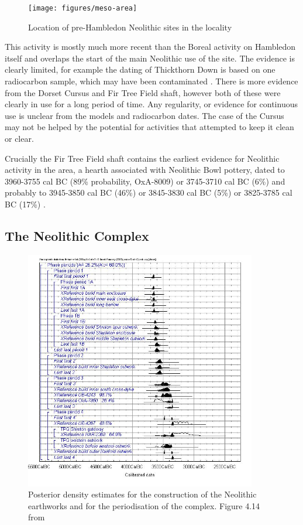 \begin{figure}
\centering
	\texttt{[image: figures/meso-area]}
  \caption{Location of pre-Hambledon Neolithic sites in the locality}
  \label{fig:meso2}
\end{figure}

This activity is mostly much more recent than the Boreal activity on Hambledon itself and overlaps the start of the main Neolithic use of the site. The evidence is clearly limited, for example the dating of Thickthorn Down is based on one radiocarbon sample, which may have been contaminated \citep[155]{Whittle:2011kl}. There is more evidence from the Dorset Cursus and Fir Tree Field shaft, however both of these were clearly in use for a long period of time. Any regularity, or evidence for continuous use is unclear from the models and radiocarbon dates. The case of the Cursus may not be helped by the potential for activities that attempted to keep it clean or clear. 

Crucially the Fir Tree Field shaft contains the earliest evidence for Neolithic activity in the area, a hearth associated with Neolithic Bowl pottery, dated to 3960-3755 cal BC (89\% probability, OxA-8009) or 3745-3710 cal BC (6\%) and probably to 3945-3850 cal BC (46\%) or 3845-3830 cal BC (5\%) or 3825-3785 cal BC (17\%) \citep[155]{Whittle:2011kl}.

\subsection{The Neolithic Complex}

\begin{figure}
\centering
	\includegraphics[width=0.9\textwidth]{figures/period-model}
  \caption{Posterior density estimates for the construction of the Neolithic earthworks and for the periodisation of the complex. Figure 4.14 from \citep[151]{Whittle:2011kl}}
  \label{fig:period-model}
\end{figure}


